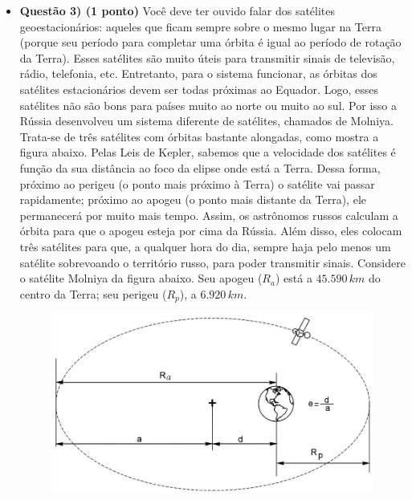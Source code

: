 \documentclass[a4paper, 12pt]{article}
\begin{document}
\begin{flushleft}
\begin{itemize}
        \item \textbf{Questão 3) (1 ponto)} Você deve ter ouvido falar dos satélites geoestacionários: aqueles que ficam sempre sobre o mesmo lugar na Terra (porque seu período para completar uma órbita é igual ao período de rotação da Terra). Esses satélites são muito úteis para transmitir sinais de televisão, rádio, telefonia, etc. \linebreak \linebreak Entretanto, para o sistema funcionar, as órbitas dos satélites estacionários devem ser todas próximas ao Equador. Logo, esses satélites não são bons para países muito ao norte ou muito ao sul. Por isso a Rússia desenvolveu um sistema diferente de satélites, chamados de Molniya. Trata-se de três satélites com órbitas bastante alongadas, como mostra a figura abaixo. \linebreak \linebreak Pelas Leis de Kepler, sabemos que a velocidade dos satélites é função da sua distância ao foco da elipse onde está a Terra. Dessa forma, próximo ao perigeu (o ponto mais próximo à Terra) o satélite vai passar rapidamente; próximo ao apogeu (o ponto mais distante da Terra), ele permanecerá por muito mais tempo. Assim, os astrônomos russos calculam a órbita para que o apogeu esteja por cima da Rússia. Além disso, eles colocam três satélites para que, a qualquer hora do dia, sempre haja pelo menos um satélite sobrevoando o território russo, para poder transmitir sinais. \linebreak \linebreak Considere o satélite Molniya da figura abaixo. Seu apogeu ($R_a$) está a $45.590 \, km$ do centro da Terra; seu perigeu ($R_p$), a $6.920 \, km$.
            \begin{figure}[H]
                \centering
                \includegraphics[scale=0.5]{img/3.png}

\end{figure}
\end{itemize}
\end{flushleft}
\end{document}
